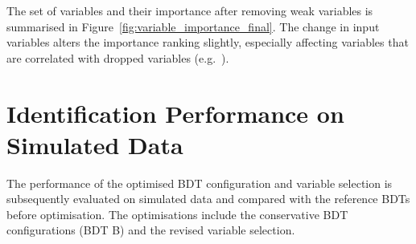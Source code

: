 The set of variables and their importance after removing weak variables is
summarised in Figure~\ref{fig:variable_importance_final}. The change in input
variables alters the importance ranking slightly, especially affecting variables
that are correlated with dropped variables (e.g.\
).



\section{Identification Performance on Simulated Data}
\label{sec:bdt_perf}

The performance of the optimised BDT configuration and variable selection is
subsequently evaluated on simulated data and compared with the reference BDTs
before optimisation. The optimisations include the conservative BDT
configurations (BDT B) and the revised variable selection.

